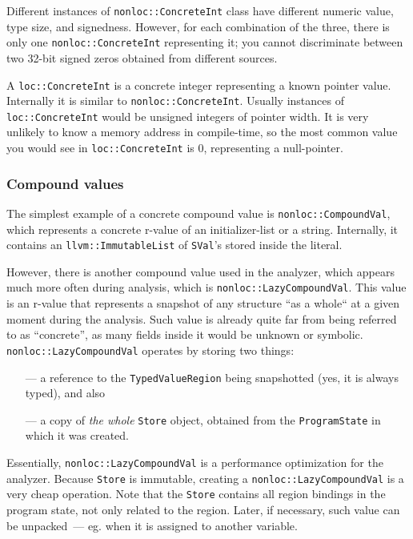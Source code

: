 \documentclass[a4paper,12pt]{article}
\begin{document}
Different instances of \lstinline|nonloc::ConcreteInt| class have different numeric value, type size, and signedness. However, for each combination of the three, there is only one \lstinline|nonloc::ConcreteInt| representing it; you cannot discriminate between two 32-bit signed zeros obtained from different sources.

A \lstinline|loc::ConcreteInt| is a concrete integer representing a known pointer value. Internally it is similar to \lstinline|nonloc::ConcreteInt|. Usually instances of \lstinline|loc::ConcreteInt| would be unsigned integers of pointer width. It is very unlikely to know a memory address in compile-time, so the most common value you would see in \lstinline|loc::ConcreteInt| is $0$, representing a null-pointer.

\subsubsection{Compound values}

The simplest example of a concrete compound value is \lstinline|nonloc::CompoundVal|, which represents a concrete r-value of an initializer-list or a string. Internally, it contains an \lstinline|llvm::ImmutableList| of \lstinline|SVal|'s stored inside the literal.

However, there is another compound value used in the analyzer, which appears much more often during analysis, which is \lstinline|nonloc::LazyCompoundVal|. This value is an r-value that represents a snapshot of any structure ``as a whole`` at a given moment during the analysis. Such value is already quite far from being referred to as ``concrete'', as many fields inside it would be unknown or symbolic. \lstinline|nonloc::LazyCompoundVal| operates by storing two things:

\begin{itemize}
\item[---] a reference to the \lstinline|TypedValueRegion| being snapshotted (yes, it is always typed), and also
\item[---] a copy of \emph{the whole} \lstinline|Store| object, obtained from the \lstinline|ProgramState| in which it was created.
\end{itemize}

Essentially, \lstinline|nonloc::LazyCompoundVal| is a performance optimization for the analyzer. Because \lstinline|Store| is immutable, creating a \lstinline|nonloc::LazyCompoundVal| is a very cheap operation. Note that the \lstinline|Store| contains all region bindings in the program state, not only related to the region. Later, if necessary, such value can be unpacked~--- eg. when it is assigned to another variable.
\end{document}
